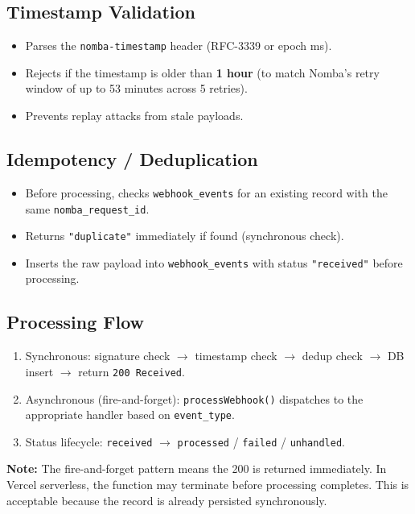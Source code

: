\documentclass[11pt,a4paper]{article}
\begin{document}
\subsection{Timestamp Validation}

\begin{itemize}[nosep]
  \item Parses the \texttt{nomba-timestamp} header (RFC-3339 or epoch ms).
  \item Rejects if the timestamp is older than \textbf{1 hour} (to match
        Nomba's retry window of up to 53 minutes across 5 retries).
  \item Prevents replay attacks from stale payloads.
\end{itemize}

\subsection{Idempotency / Deduplication}

\begin{itemize}[nosep]
  \item Before processing, checks \texttt{webhook\_events} for an existing
        record with the same \texttt{nomba\_request\_id}.
  \item Returns \texttt{"duplicate"} immediately if found (synchronous check).
  \item Inserts the raw payload into \texttt{webhook\_events} with status
        \texttt{"received"} before processing.
\end{itemize}

\subsection{Processing Flow}

\begin{enumerate}[nosep]
  \item Synchronous: signature check $\rightarrow$ timestamp check
        $\rightarrow$ dedup check $\rightarrow$ DB insert $\rightarrow$
        return \texttt{200 Received}.
  \item Asynchronous (fire-and-forget): \texttt{processWebhook()} dispatches
        to the appropriate handler based on \texttt{event\_type}.
  \item Status lifecycle: \texttt{received} $\rightarrow$
        \texttt{processed} / \texttt{failed} / \texttt{unhandled}.
\end{enumerate}

\textbf{Note:} The fire-and-forget pattern means the 200 is returned
immediately. In Vercel serverless, the function may terminate before
processing completes. This is acceptable because the record is already
persisted synchronously.
\end{document}
